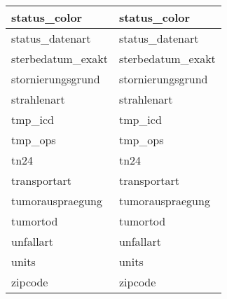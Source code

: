 \begin{longtable}{||l|l||}
  	status\_color & status\_color\\ \hline
  	status\_datenart & status\_datenart\\ \hline
  	sterbedatum\_exakt & sterbedatum\_exakt\\ \hline
  	stornierungsgrund & stornierungsgrund\\ \hline
  	strahlenart & strahlenart\\ \hline
  	tmp\_icd & tmp\_icd\\ \hline
  	tmp\_ops & tmp\_ops\\ \hline
  	tn24 & tn24\\ \hline
  	transportart & transportart\\ \hline
  	tumorauspraegung & tumorauspraegung\\ \hline
  	tumortod & tumortod\\ \hline
  	unfallart & unfallart\\ \hline
  	units & units\\ \hline
  	zipcode & zipcode\\ \hline
  
  \end{longtable}